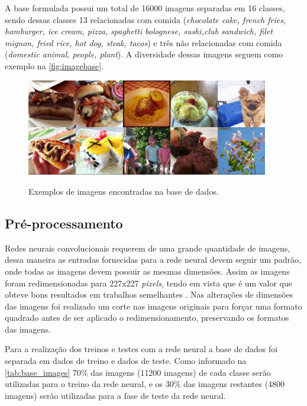 \par A base formulada possui um total de 16000 imagens separadas em 16 classes, sendo dessas classes 13  relacionadas com comida (\textit{chocolate cake, french fries, hamburger, ice cream, pizza, spaghetti bolognese, sushi,club sandwich, filet mignon, fried rice, hot dog, steak, tacos}) e três não relacionadas com comida (\textit{domestic animal, people, plant}). A diversidade dessas imagens seguem como exemplo na \autoref{fig:imagebase}.
\begin{figure}[H]
  \centering
  \caption{Exemplos de imagens encontradas na base de dados.}
  \includegraphics[width=300pt]{dados/figuras/imagembase}
  \label{fig:imagebase}
\end{figure}

\subsection{Pré-processamento}
\par Redes neurais convolucionais requerem de uma grande quantidade de imagens, dessa maneira as entradas fornecidas para a rede neural devem seguir um padrão, onde todas as imagens devem possuir as mesmas dimensões. Assim as imagens foram redimensionadas para 227x227 \textit{pixels}, tendo em vista que é um valor que obteve bons resultados em trabalhos semelhantes \cite{imaginetArticle}. Nas alterações de dimensões das imagens foi realizado um corte nas imagens originais para forçar uma formato quadrado antes de ser aplicado o redimensionamento, preservando os formatos das imagens.
\par Para a realização dos treinos e testes com a rede neural a base de dados foi separada em dados de treino e dados de teste. Como informado na \autoref{tab:base_images} 70\% das imagens (11200 imagens) de cada classe serão utilizadas para o treino da rede neural, e os 30\% das imagens restantes (4800 imagens) serão utilizadas para a fase de teste da rede neural.

